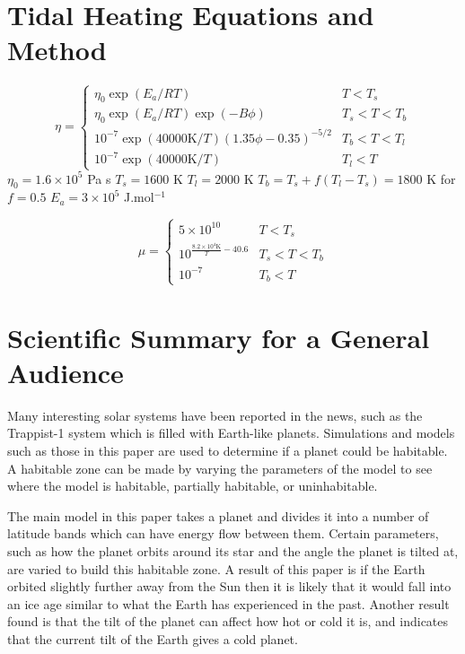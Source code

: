 \documentclass[12pt, onecolumn]{revtex4-2}    %
\begin{document}
\section{Tidal Heating Equations and Method} \label{appx:TidalHeatingEquationsMethod}
\begin{equation}
  \eta = 
  \begin{cases}
    \eta_0 \exp{(E_a / R T)} & T < T_s \\
    \eta_0 \exp{(E_a / R T)} \exp{(-B \phi)} & T_s < T < T_b \\
    10^{-7} \exp{(40000\text{K} / T)} (1.35 \phi - 0.35)^{-5/2} & T_b < T < T_l \\
    10^{-7} \exp{(40000\text{K} / T)} & T_l < T
  \end{cases}
\end{equation}
$\eta_0 = 1.6 \times 10^5$ Pa s
$T_s = 1600$ K
$T_l = 2000$ K
$T_b = T_s + f (T_l - T_s) = 1800$ K for $f=0.5$
$E_a = 3\times10^5$ J.mol$^{-1}$

\begin{equation}
  \mu = 
  \begin{cases}
    5\times10^{10} & T < T_s \\
    10^{\frac{8.2\times10^4\text{K}}{T} - 40.6} & T_s < T < T_b \\
    10^{-7} & T_b < T
  \end{cases}
\end{equation}

\clearpage

\section*{Scientific Summary for a General Audience}

Many interesting solar systems have been reported in the news, such as the Trappist-1 system which is filled with Earth-like planets.
Simulations and models such as those in this paper are used to determine if a planet could be habitable.
A habitable zone can be made by varying the parameters of the model to see where the model is habitable, partially habitable, or uninhabitable.

The main model in this paper takes a planet and divides it into a number of latitude bands which can have energy flow between them.
Certain parameters, such as how the planet orbits around its star and the angle the planet is tilted at, are varied to build this habitable zone.
A result of this paper is if the Earth orbited slightly further away from the Sun then it is likely that it would fall into an ice age similar to what the Earth has experienced in the past.
Another result found is that the tilt of the planet can affect how hot or cold it is, and indicates that the current tilt of the Earth gives a cold planet.
\end{document}
